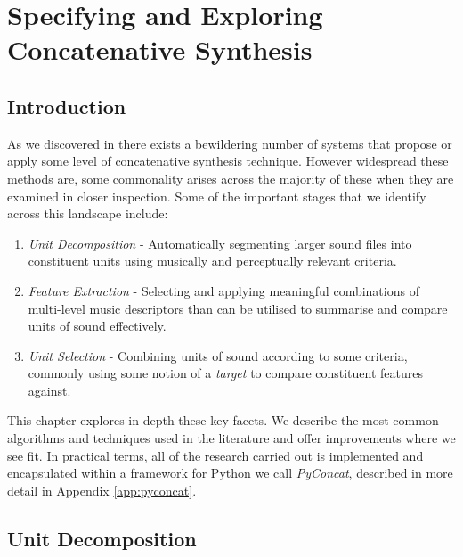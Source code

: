 \chapter{Specifying and Exploring Concatenative Synthesis}
\label{chap:pyconcat}

\section{Introduction}

As we discovered in  there exists a bewildering number of systems that propose or apply some level of concatenative synthesis technique. However widespread these methods are, some commonality arises across the majority of these when they are examined in closer inspection. Some of the important stages that we identify across this landscape include: 

\begin{enumerate}
  \item \textit{Unit Decomposition} - Automatically segmenting larger sound files into constituent units using musically and perceptually relevant criteria.
  \item \textit{Feature Extraction} - Selecting and applying meaningful combinations of multi-level music descriptors than can be utilised to summarise and compare units of sound effectively.
  \item \textit{Unit Selection} - Combining units of sound according to some criteria, commonly using some notion of a \textit{target} to compare constituent features against.  
\end{enumerate}

This chapter explores in depth these key facets. We describe the most common algorithms and techniques used in the literature and offer improvements where we see fit. In practical terms, all of the research carried out is implemented and encapsulated within a framework for Python we call \textit{PyConcat}, described in more detail in Appendix  \ref{app:pyconcat}. 

\section{Unit Decomposition}

